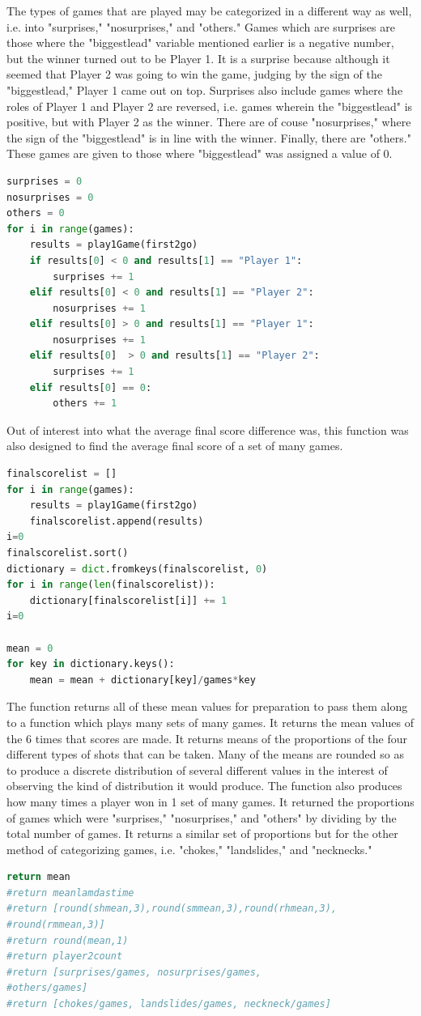 \documentclass{article}
\begin{document}
The types of games that are played may be categorized in a different way as well, i.e. into "surprises," "nosurprises," and "others." Games which are surprises are those where the "biggestlead" variable mentioned earlier is a negative number, but the winner turned out to be Player 1. It is a surprise because although it seemed that Player 2 was going to win the game, judging by the sign of the "biggestlead," Player 1 came out on top. Surprises also include games where the roles of Player 1 and Player 2 are reversed, i.e. games wherein the "biggestlead" is positive, but with Player 2 as the winner. There are of couse "nosurprises," where the sign of the "biggestlead" is in line with the winner. Finally, there are "others." These games are given to those where "biggestlead" was assigned a value of 0.
\begin{lstlisting}[language=Python]
surprises = 0
nosurprises = 0
others = 0
for i in range(games):
    results = play1Game(first2go)
    if results[0] < 0 and results[1] == "Player 1":
        surprises += 1
    elif results[0] < 0 and results[1] == "Player 2":
        nosurprises += 1
    elif results[0] > 0 and results[1] == "Player 1":
        nosurprises += 1
    elif results[0]  > 0 and results[1] == "Player 2":
        surprises += 1
    elif results[0] == 0:
        others += 1
\end{lstlisting}

Out of interest into what the average final score difference was, this function was also designed to find the average final score of a set of many games.
\begin{lstlisting}[language=Python]
finalscorelist = []
for i in range(games):
    results = play1Game(first2go)
    finalscorelist.append(results)
i=0
finalscorelist.sort()    
dictionary = dict.fromkeys(finalscorelist, 0)
for i in range(len(finalscorelist)):
    dictionary[finalscorelist[i]] += 1
i=0    

mean = 0
for key in dictionary.keys():
    mean = mean + dictionary[key]/games*key
\end{lstlisting}
The function returns all of these mean values for preparation to pass them along to a function which plays many sets of many games. It returns the mean values of the 6 times that scores are made. It returns means of the proportions of the four different types of shots that can be taken. Many of the means are rounded so as to produce a discrete distribution of several different values in the interest of observing the kind of distribution it would produce. The function also produces how many times a player won in 1 set of many games. It returned the proportions of games which were "surprises," "nosurprises," and "others" by dividing by the total number of games. It returns a similar set of proportions but for the other method of categorizing games, i.e. "chokes," "landslides," and "necknecks."
\begin{lstlisting}[language=Python]
return mean
#return meanlamdastime
#return [round(shmean,3),round(smmean,3),round(rhmean,3),
#round(rmmean,3)]
#return round(mean,1)
#return player2count
#return [surprises/games, nosurprises/games, 
#others/games]
#return [chokes/games, landslides/games, neckneck/games]
\end{lstlisting}
\end{document}
